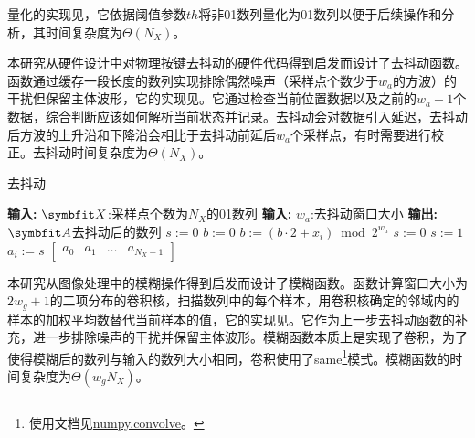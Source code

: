 {	量化的实现见，它依据阈值参数$th$将非01数列量化为01数列以便于后续操作和分析，其时间复杂度为$\Theta(N_X)$。
	
	本研究从硬件设计中对物理按键去抖动的硬件代码得到启发而设计了去抖动函数。函数通过缓存一段长度的数列实现排除偶然噪声（采样点个数少于$w_a$的方波）的干扰但保留主体波形，它的实现见。它通过检查当前位置数据以及之前的$w_a-1$个数据，综合判断应该如何解析当前状态并记录。去抖动会对数据引入延迟，去抖动后方波的上升沿和下降沿会相比于去抖动前延后$w_a$个采样点，有时需要进行校正。去抖动时间复杂度为$\Theta(N_X)$。
	
	\begin{breakablealgorithm}
		\caption{去抖动}\label{alg:antijitter}
		\begin{algorithmic}[1]
			\Statex \textbf{输入:} $\Vector X$:采样点个数为$N_X$的01数列
			\Statex \textbf{输入:} $w_a$:去抖动窗口大小
			\Statex \textbf{输出:} $\Vector A$去抖动后的数列
			\State $s:=0$
			\State $b:=0$
			\State $b:=(b\cdot2+x_i)\bmod 2^{w_a}$
			\State $s:=0$
			\State $s:=1$
			\EndIf
			\State $a_i:=s$
			\EndFor
			\State \Return $\begin{bmatrix}a_0&a_1&\ldots&a_{N_X-1}\end{bmatrix}$
		\end{algorithmic}
	\end{breakablealgorithm}
	
	本研究从图像处理中的模糊操作得到启发而设计了模糊函数。函数计算窗口大小为$2w_g+1$的二项分布的卷积核，扫描数列中的每个样本，用卷积核确定的邻域内的样本的加权平均数替代当前样本的值，它的实现见。它作为上一步去抖动函数的补充，进一步排除噪声的干扰并保留主体波形。模糊函数本质上是实现了卷积，为了使得模糊后的数列与输入的数列大小相同，卷积使用了same\footnote{使用文档见\href{https://numpy.org/doc/stable/reference/generated/numpy.convolve.html}{numpy.convolve}。}模式。模糊函数的时间复杂度为$\Theta(w_gN_X)$。
	
}
